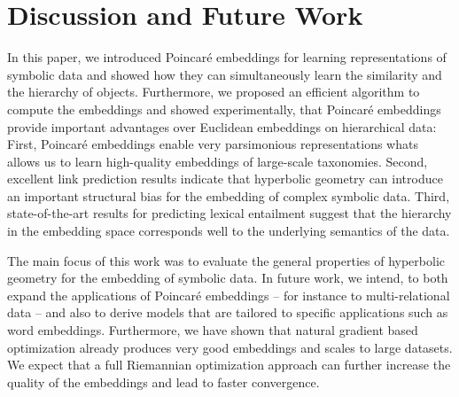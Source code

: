 \documentclass[11pt]{article}
\begin{document}
\section{Discussion and Future Work}
\label{sec:org466597f}
In this paper, we introduced Poincaré embeddings for learning representations of
symbolic data and showed how they can simultaneously learn the
similarity and the hierarchy of objects. Furthermore, we proposed an efficient
algorithm to compute the embeddings and showed experimentally, that Poincaré
embeddings provide important advantages over Euclidean embeddings on
hierarchical data: First, Poincaré embeddings enable very parsimonious
representations whats allows us to learn high-quality embeddings of large-scale
taxonomies. Second, excellent link prediction results indicate that hyperbolic
geometry can introduce an important structural bias for the embedding of complex
symbolic data. Third, state-of-the-art results for predicting lexical entailment
suggest that the hierarchy in the embedding space corresponds well to the
underlying semantics of the data.

The main focus of this work was to evaluate the general properties of hyperbolic
geometry for the embedding of symbolic data. In future work, we intend, to both expand
the applications of Poincaré embeddings -- for instance to multi-relational data
-- and also to derive models that are tailored to specific applications such as
word embeddings. Furthermore, we have shown that natural gradient based
optimization already produces very good embeddings and scales to large
datasets. We expect that a full Riemannian optimization approach can further
increase the quality of the embeddings and lead to faster convergence.



\end{document}
